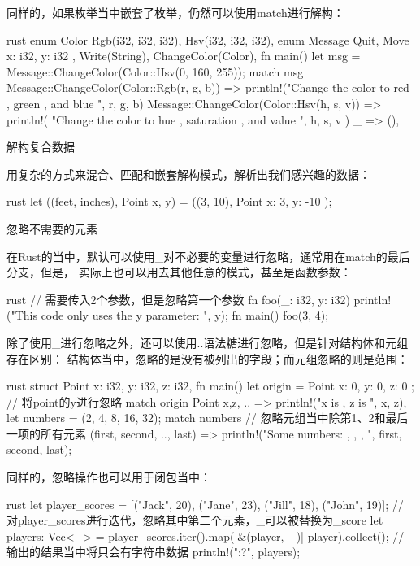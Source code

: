 \begin{outline}[enumerate]
同样的，如果枚举当中嵌套了枚举，仍然可以使用match进行解构：
\begin{code-in-enumerate}{rust}
enum Color {
    Rgb(i32, i32, i32),
    Hsv(i32, i32, i32),
}
enum Message {
    Quit,
    Move { x: i32, y: i32 },
    Write(String),
    ChangeColor(Color),
}
fn main() {
    let msg = Message::ChangeColor(Color::Hsv(0, 160, 255));
    match msg {
        Message::ChangeColor(Color::Rgb(r, g, b)) => {
            println!("Change the color to red {}, green {}, and blue {}", r, g, b)
        }
        Message::ChangeColor(Color::Hsv(h, s, v)) => {
            println!(
                "Change the color to hue {}, saturation {}, and value {}",
                h, s, v
            )
        }
        _ => (),
    }
}
\end{code-in-enumerate}

\1 解构复合数据

用复杂的方式来混合、匹配和嵌套解构模式，解析出我们感兴趣的数据：
\begin{code-in-enumerate}{rust}
let ((feet, inches), Point {x, y}) = ((3, 10), Point { x: 3, y: -10 });
\end{code-in-enumerate}

\1 忽略不需要的元素

在Rust的当中，默认可以使用\_对不必要的变量进行忽略，通常用在match的最后分支，但是，
实际上也可以用去其他任意的模式，甚至是函数参数：
\begin{code-in-enumerate}{rust}
// 需要传入2个参数，但是忽略第一个参数
fn foo(_: i32, y: i32) {
    println!("This code only uses the y parameter: {}", y);
}
fn main() {
    foo(3, 4);
}
\end{code-in-enumerate}

除了使用\_进行忽略之外，还可以使用..语法糖进行忽略，但是针对结构体和元组存在区别：
结构体当中，忽略的是没有被列出的字段；而元组忽略的则是范围：
\begin{code-in-enumerate}{rust}
struct Point {
    x: i32,
    y: i32,
    z: i32,
}
fn main() {
    let origin = Point { x: 0, y: 0, z: 0 };
    // 将point的y进行忽略
    match origin {
        Point { x,z, .. } => println!("x is {}, z is {}", x, z),
    }
    let numbers = (2, 4, 8, 16, 32);
    match numbers {
        // 忽略元组当中除第1、2和最后一项的所有元素
        (first, second, .., last) => {
            println!("Some numbers: {}, {}, {}, ", first, second, last);
        }
    }
}
\end{code-in-enumerate}

同样的，忽略操作也可以用于闭包当中：
\begin{code-in-enumerate}{rust}
let player_scores = [("Jack", 20), ("Jane", 23), ("Jill", 18), ("John", 19)];
// 对player_scores进行迭代，忽略其中第二个元素，_可以被替换为_score
let players: Vec<_> = player_scores.iter().map(|&(player, _)| player).collect();
// 输出的结果当中将只会有字符串数据
println!("{:?}", players);
\end{code-in-enumerate}


\end{outline}
